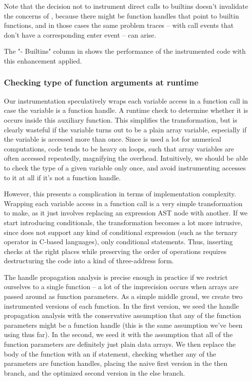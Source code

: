 Note that the decision not to instrument direct calls to builtins doesn't
invalidate the concerns of , because there
might be function handles that point to builtin functions, and in those
cases the same problem traces -- with call events that don't have a
corresponding enter event -- can arise.

The "- Builtins" column in  shows the
performance of the instrumented code with this enhancement applied.

\subsubsection{Checking type of function arguments at runtime}

Our instrumentation speculatively wraps each variable access in a function call
in case the variable is a function handle. A runtime check to determine whether
it is occurs inside this auxiliary function. This simplifies the
transformation, but is clearly wasteful if the variable turns out to be a plain
array variable, especially if the variable is accessed more than once. Since
\matlab is used a lot for numerical computations, \matlab code tends to be
heavy on loops, such that array variables are often accessed repeatedly,
magnifying the overhead. Intuitively, we should be able to check the type of a
given variable only once, and avoid instrumenting accesses to it at all if it's
not a function handle.

However, this presents a complication in terms of implementation complexity.
Wrapping each variable access in a function call is a very simple
transformation to make, as it just involves replacing an expression AST node
with another. If we start introducing conditionals, the transformation becomes
a lot more intrusive, since \matlab does not support any kind of conditional
expression (such as the ternary \code{\?:} operator in C-based languages), only
conditional statements. Thus, inserting checks at the right places while
preserving the order of operations requires destructuring the code into a kind
of three-address form.

The handle propagation analysis is precise enough in practice if we restrict
ourselves to a single function -- a lot of the imprecision occurs when arrays
are passed around as function parameters. As a simple middle groud, we create
two instrumented versions of each function. In the first version, we seed the
handle propagation analysis with the conservative assumption that any of the
function parameters might be a function handle (this is the same assumption
we've been using thus far). In the second, we seed it with the assumption that
all of the function parameters are definitely just plain data arrays. We then
replace the body of the function with an if statement, checking whether any of
the parameters are function handles, placing the naive first version in the
then branch, and the optimized second version in the else branch.

